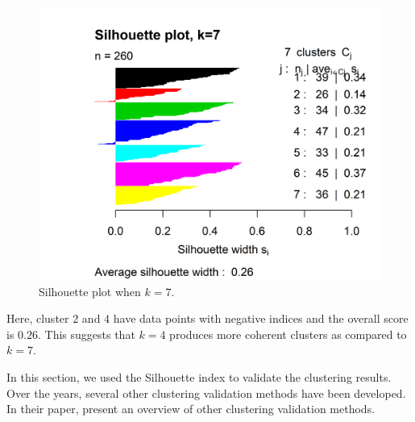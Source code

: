 \documentclass[
  11pt,
]{krantz}
\makeatletter
\newenvironment{Shaded}{\begin{snugshade}}{\end{snugshade}}
\newcommand{\AttributeTok}[1]{\textcolor[rgb]{0.61,0.61,0.61}{#1}}
\newcommand{\ConstantTok}[1]{\textcolor[rgb]{0,0,0}{#1}}
\newcommand{\DecValTok}[1]{\textcolor[rgb]{0.06,0.06,0.06}{#1}}
\newcommand{\FloatTok}[1]{\textcolor[rgb]{0.06,0.06,0.06}{#1}}
\newcommand{\FunctionTok}[1]{\textcolor[rgb]{0,0,0}{#1}}
\newcommand{\NormalTok}[1]{#1}
\newcommand{\OtherTok}[1]{\textcolor[rgb]{0.37,0.37,0.37}{#1}}
\newcommand{\SpecialCharTok}[1]{\textcolor[rgb]{0,0,0}{#1}}
\newcommand{\StringTok}[1]{\textcolor[rgb]{0.5,0.5,0.5}{#1}}
\newenvironment{kframe}{%
\medskip{}
\setlength{\fboxsep}{.8em}
 \def\at@end@of@kframe{}%
 \ifinner\ifhmode%
  \def\at@end@of@kframe{\end{minipage}}%
  \begin{minipage}{\columnwidth}%
 \fi\fi%
 \def\FrameCommand##1{\hskip\@totalleftmargin \hskip-\fboxsep
 \colorbox{shadecolor}{##1}\hskip-\fboxsep
     \hskip-\linewidth \hskip-\@totalleftmargin \hskip\columnwidth}%
 \MakeFramed {\advance\hsize-\width
   \@totalleftmargin\z@ \linewidth\hsize
   \@setminipage}}%
 {\par\unskip\endMakeFramed%
 \at@end@of@kframe}
\newenvironment{rmdblock}[1]
  {
  \begin{itemize}
  \renewcommand{\labelitemi}{
    \raisebox{-.7\height}[0pt][0pt]{
      {\setkeys{Gin}{width=3em,keepaspectratio}\texttt{[image: images/icons/\#1]}}
    }
  }
  \setlength{\fboxsep}{1em}
  \begin{kframe}
  \item
  }
  {
  \end{kframe}
  \end{itemize}
  }
\newenvironment{rmdinfo}
  {\begin{rmdblock}{info}}
  {\end{rmdblock}}
\makeatother
\begin{document}
\begin{Shaded}
\end{Shaded}



\begin{figure}

{\centering \includegraphics[width=0.8\linewidth]{images/si_7} 

}

\caption{Silhouette plot when \(k=7\).}\label{fig:si7}
\end{figure}

Here, cluster \(2\) and \(4\) have data points with negative indices and the overall score is \(0.26\). This suggests that \(k=4\) produces more coherent clusters as compared to \(k=7\).

\begin{rmdinfo}
In this section, we used the Silhouette index to validate the clustering results. Over the years, several other clustering validation methods have been developed. In their paper, \citet{Halkidi2001} present an overview of other clustering validation methods.
\end{rmdinfo}
\end{document}
